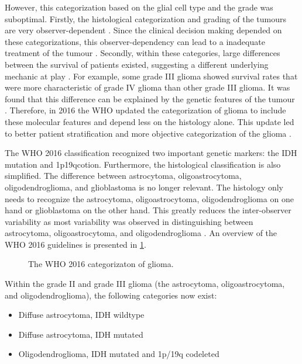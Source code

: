 However, this categorization based on the glial cell type and the grade was suboptimal.
Firstly, the histological categorization and grading of the tumours are very observer-dependent \autocite{mittler1996gradingreliability, vandenbent2010interobserver}.
Since the clinical decision making depended on these categorizations, this observer-dependency can lead to a inadequate treatment of the tumour \autocite{vandenbent2010interobserver}.
Secondly, within these categories, large differences between the survival of patients existed, suggesting a different underlying mechanic at play \autocite{dubbink2015molecular}.
For example, some grade III glioma showed survival rates that were more characteristic of grade IV glioma than other grade III glioma.
It was found that this difference can be explained by the genetic features of the tumour \autocite{dubbink2015molecular,eckel2015gliomagroups}.
Therefore, in 2016 the \gls{WHO} updated the categorization of glioma to include these molecular features \cite{louis20162016} and depend less on the histology alone.
This update led to better patient stratification and more objective categorization of the glioma \autocite{molinaro2019geneticepidemiology}.

The WHO 2016 classification recognized two important genetic markers:  the \gls{IDH} mutation and \acl{1p19qcotion}.
Furthermore, the histological classification is also simplified.
The difference between astrocytoma, oligoastrocytoma, oligodendroglioma, and glioblastoma is no longer relevant.
The histology only needs to recognize the astrocytoma, oligoastrocytoma, oligodendroglioma on one hand or glioblastoma on the other hand.
This greatly reduces the inter-observer variability as most variability was observed in distinguishing between astrocytoma, oligoastrocytoma, and oligodendroglioma \autocite{mittler1996gradingreliability}.
An overview of the \gls{WHO} 2016 guidelines is presented in \cref{fig:intro_glioma_categorization}.


\begin{figure}[hbt]
    \centering
    \caption{The WHO 2016 categorizaton of glioma.}\label{fig:intro_glioma_categorization}
\end{figure}


Within the grade II and grade III glioma (the astrocytoma, oligoastrocytoma, and oligodendroglioma), the following categories now exist:

\begin{itemize}
    \item Diffuse astrocytoma, \gls{IDH} wildtype
    \item Diffuse astrocytoma, \gls{IDH} mutated
    \item Oligodendroglioma, \gls{IDH} mutated and 1p/19q codeleted
\end{itemize}

